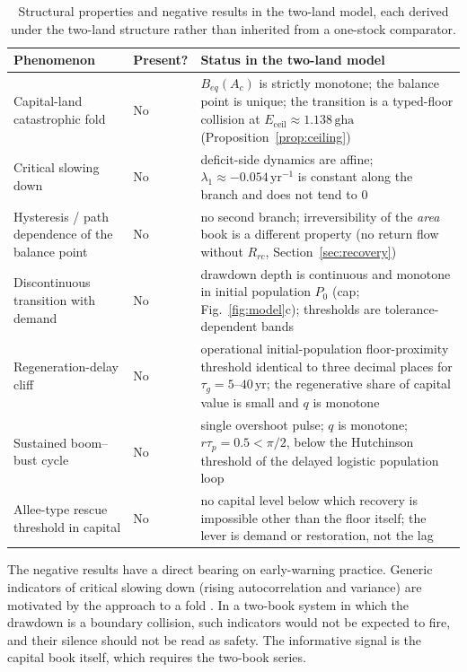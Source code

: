 \documentclass[preprint,12pt,authoryear]{elsarticle}
\newcommand{\Eceil}{E_{\mathrm{ceil}}}
\begin{document}
\begin{table}[!htbp]
\centering\small
\caption{Structural properties and negative results in the two-land model, each derived under the two-land structure rather than inherited from a one-stock comparator.}
\label{tab:neg}
\begin{tabularx}{\textwidth}{>{\raggedright\arraybackslash}p{} l X}
\toprule
Phenomenon & Present? & Status in the two-land model \\
\midrule
Capital-land catastrophic fold & No & $B_{eq}(A_c)$ is strictly monotone; the balance point is unique; the transition is a typed-floor collision at $\Eceil\approx1.138\,\mathrm{gha}$ (Proposition~\ref{prop:ceiling}) \\
Critical slowing down & No & deficit-side dynamics are affine; $\lambda_1\approx-0.054\,\mathrm{yr}^{-1}$ is constant along the branch and does not tend to $0$ \\
Hysteresis / path dependence of the balance point & No & no second branch; irreversibility of the \emph{area} book is a different property (no return flow without $R_{rc}$, Section~\ref{sec:recovery}) \\
Discontinuous transition with demand & No & drawdown depth is continuous and monotone in initial population $P_0$ (cap; Fig.~\ref{fig:model}c); thresholds are tolerance-dependent bands \\
Regeneration-delay cliff & No & operational initial-population floor-proximity threshold identical to three decimal places for $\tau_g=5$--$40$\,yr; the regenerative share of capital value is small and $q$ is monotone \\
Sustained boom--bust cycle & No & single overshoot pulse; $q$ is monotone; $r\tau_p=0.5<\pi/2$, below the Hutchinson threshold of the delayed logistic population loop \citep{Hutchinson1948} \\
Allee-type rescue threshold in capital & No & no capital level below which recovery is impossible other than the floor itself; the lever is demand or restoration, not the lag \\
\bottomrule
\end{tabularx}
\end{table}

The negative results have a direct bearing on early-warning practice. Generic indicators of critical slowing down (rising autocorrelation and variance) are motivated by the approach to a fold \citep{Scheffer2001}. In a two-book system in which the drawdown is a boundary collision, such indicators would not be expected to fire, and their silence should not be read as safety. The informative signal is the capital book itself, which requires the two-book series.
\end{document}
